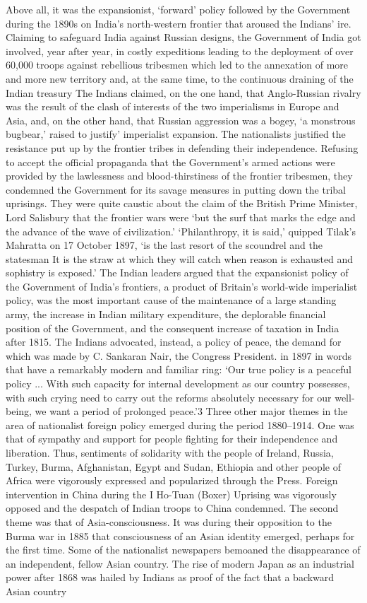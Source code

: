 Above all, it was the expansionist, `forward' policy followed by the Government during the 1890s on India's north-western frontier that aroused the Indians' ire. Claiming to safeguard India against Russian designs, the Government of India got involved, year after year, in costly expeditions leading to the deployment of over 60,000 troops against rebellious tribesmen which led to the annexation of more and more new territory and, at the same time, to the continuous draining of the Indian treasury The Indians claimed, on the one hand, that Anglo-Russian rivalry was the result of the clash of interests of the two imperialisms in Europe and Asia, and, on the other hand, that Russian aggression was a bogey, `a monstrous bugbear,' raised to justify' imperialist expansion. The nationalists justified the resistance put up by the frontier tribes in defending their independence. Refusing to accept the official propaganda that the Government's armed actions were provided by the lawlessness and blood-thirstiness of the frontier tribesmen, they condemned the Government for its savage measures in putting down the tribal uprisings. They were quite caustic about the claim of the British Prime Minister, Lord Salisbury that the frontier wars were `but the surf that marks the edge and the advance of the wave of civilization.' `Philanthropy, it is said,' quipped Tilak's Mahratta on 17 October 1897, `is the last resort of the scoundrel and the statesman It is the straw at which they will catch when reason is exhausted and sophistry is exposed.' The Indian leaders argued that the expansionist policy of the Government of India's frontiers, a product of Britain's world-wide imperialist policy, was the most important cause of the maintenance of a large standing army, the increase in Indian military expenditure, the deplorable financial position of the Government, and the consequent increase of taxation in India after 1815. The Indians advocated, instead, a policy of peace, the demand for which was made by C. Sankaran Nair, the Congress President. in 1897 in words that have a remarkably modern and familiar ring: `Our true policy is a peaceful policy ... With such capacity for internal development as our country possesses, with such crying need to carry out the reforms absolutely necessary for our well-being, we want a period of prolonged peace.'3 Three other major themes in the area of nationalist foreign policy emerged during the period 1880--1914. One was that of sympathy and support for people fighting for their independence and liberation. Thus, sentiments of solidarity with the people of Ireland, Russia, Turkey, Burma, Afghanistan, Egypt and Sudan, Ethiopia and other people of Africa were vigorously expressed and popularized through the Press. Foreign intervention in China during the I Ho-Tuan (Boxer) Uprising was vigorously opposed and the despatch of Indian troops to China condemned. The second theme was that of Asia-consciousness. It was during their opposition to the Burma war in 1885 that consciousness of an Asian identity emerged, perhaps for the first time. Some of the nationalist newspapers bemoaned the disappearance of an independent, fellow Asian country. The rise of modern Japan as an industrial power after 1868 was hailed by Indians as proof of the fact that a backward Asian country 
